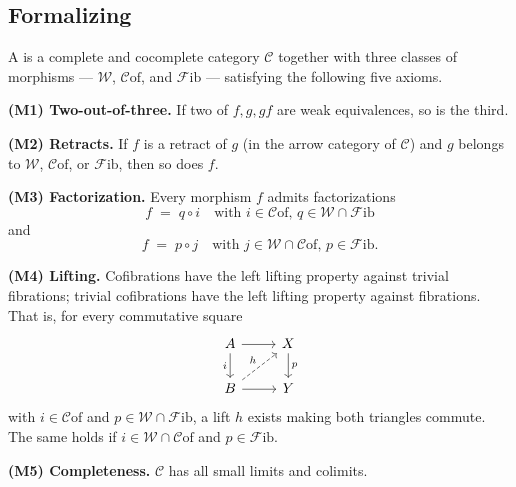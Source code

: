 \subsection{Formalizing}

\begin{definition}
\label{def:model-category}
A  is a complete and cocomplete category $\mathcal{C}$
together with three classes of morphisms — 
$\mathcal{W}$,  $\mathcal{C}\mathrm{of}$, and
 $\mathcal{F}\mathrm{ib}$ — satisfying the following
five axioms.

\medskip
\textbf{(M1) Two-out-of-three.} If two of $f, g, gf$ are weak
equivalences, so is the third.

\medskip
\textbf{(M2) Retracts.} If $f$ is a retract of $g$ (in the arrow category
of $\mathcal{C}$) and $g$ belongs to $\mathcal{W}$, $\mathcal{C}\mathrm{of}$,
or $\mathcal{F}\mathrm{ib}$, then so does $f$.

\medskip
\textbf{(M3) Factorization.} Every morphism $f$ admits factorizations
\begin{equation*}
  f \;=\; q \circ i \quad \text{with } i \in \mathcal{C}\mathrm{of}, \, q \in \mathcal{W} \cap \mathcal{F}\mathrm{ib}
\end{equation*}
and
\begin{equation*}
  f \;=\; p \circ j \quad \text{with } j \in \mathcal{W} \cap \mathcal{C}\mathrm{of}, \, p \in \mathcal{F}\mathrm{ib}.
\end{equation*}

\medskip
\textbf{(M4) Lifting.} Cofibrations have the left lifting property
against trivial fibrations; trivial cofibrations have the left lifting
property against fibrations. That is, for every commutative square
\begin{equation*}
  \begin{tikzcd}
    A \arrow[r] \arrow[d, "i"'] & X \arrow[d, "p"] \\
    B \arrow[r] \arrow[ur, dashed, "h"] & Y
  \end{tikzcd}
\end{equation*}
with $i \in \mathcal{C}\mathrm{of}$ and $p \in \mathcal{W} \cap
\mathcal{F}\mathrm{ib}$, a lift $h$ exists making both triangles commute.
The same holds if $i \in \mathcal{W} \cap \mathcal{C}\mathrm{of}$ and
$p \in \mathcal{F}\mathrm{ib}$.

\medskip
\textbf{(M5) Completeness.} $\mathcal{C}$ has all small limits and
colimits.
\end{definition}

